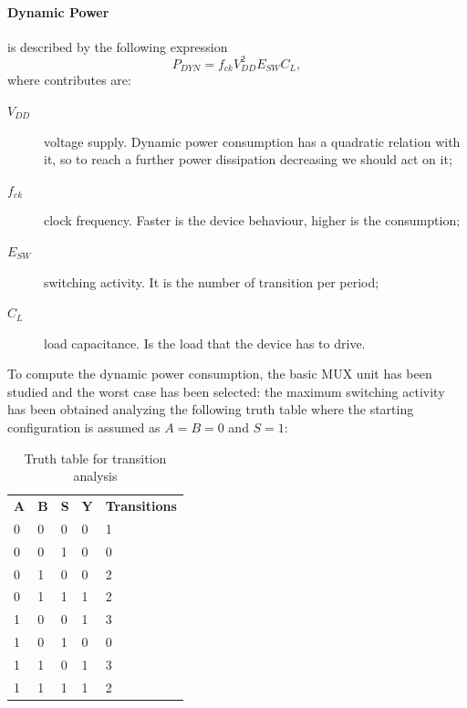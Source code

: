 \paragraph{Dynamic Power}
is described by the following expression
\begin{equation*}
P_{DYN}= f_{ck} V_{DD}^{2} E_{SW} C_{L},
\end{equation*}
where contributes are:
	\begin{description}
		\item[$V_{DD}$] voltage supply. Dynamic power consumption has a quadratic relation with it, so to reach a further power dissipation decreasing we should act on it;
		\item[$f_{ck}$] clock frequency. Faster is the device behaviour, higher is the consumption;
		\item[$E_{SW}$] switching activity. It is the number of transition per period;
		\item[$C_{L}$] load capacitance. Is the load that the device has to drive.
	\end{description}
To compute the dynamic power consumption, the basic MUX unit has been studied and the worst case has been selected: the maximum switching activity has been obtained analyzing the following truth table where the starting configuration is assumed as $A=B=0$ and $S=1$:
	\begin{table}[h]
	\centering
	\caption{Truth table for transition analysis}
	\label{my-label}
		\begin{tabular}{lllll}
		\textbf{A} & \textbf{B} & \textbf{S} & \textbf{Y} & \textbf{Transitions} \\
		0          & 0          & 0          & 0          & 1                    \\
		0          & 0          & 1          & 0          & 0                    \\
		0          & 1          & 0          & 0          & 2                    \\
		0          & 1          & 1          & 1          & 2                    \\
		1          & 0          & 0          & 1          & 3                    \\
		1          & 0          & 1          & 0          & 0                    \\
		1          & 1          & 0          & 1          & 3                    \\
		1          & 1          & 1          & 1          & 2                   
		\end{tabular}
	\end{table}

